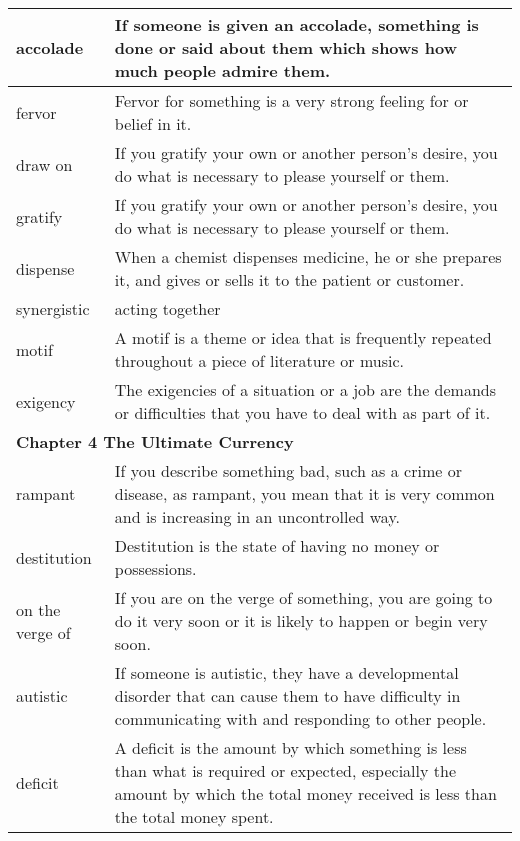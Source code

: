 \documentclass{article}
\begin{document}
\begin{center}
\begin{longtable}{|l|p{7cm}|}
\hline
accolade
&
If someone is given an accolade, something is done or said about them which shows how much people admire them.
\\

\hline
fervor
&
Fervor for something is a very strong feeling for or belief in it.
\\

\hline
draw on
&
If you gratify your own or another person's desire, you do what is necessary to please yourself or them.
\\

\hline
gratify
&
If you gratify your own or another person's desire, you do what is necessary to please yourself or them.
\\

\hline
dispense
&
When a chemist dispenses medicine, he or she prepares it, and gives or sells it to the patient or customer.
\\

\hline
synergistic
&
acting together
\\

\hline
motif
&
A motif is a theme or idea that is frequently repeated throughout a piece of literature or music.
\\

\hline
exigency
&
The exigencies of a situation or a job are the demands or difficulties that you have to deal with as part of it.
\\

\hline
\multicolumn{2}{|l|}{\textbf{Chapter 4 The Ultimate Currency}}\\
\hline
rampant
&
If you describe something bad, such as a crime or disease, as rampant, you mean that it is very common and is increasing in an uncontrolled way.
\\

\hline
destitution
&
Destitution is the state of having no money or possessions.
\\

\hline
on the verge of
&
If you are on the verge of something, you are going to do it very soon or it is likely to happen or begin very soon.
\\

\hline
autistic
&
If someone is autistic, they have a developmental disorder that can cause them to have difficulty in communicating with and responding to other people.
\\

\hline
deficit
&
A deficit is the amount by which something is less than what is required or expected, especially the amount by which the total money received is less than the total money spent.
\\


\end{longtable}
\end{center}
\end{document}

